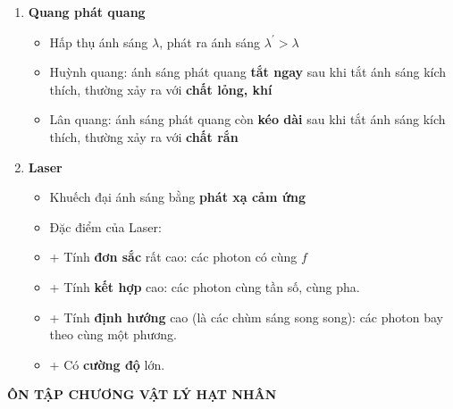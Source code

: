\documentclass[a4paper,12pt,titlepage,twocolumn]{article}
\newenvironment{myitemize} 
{ \begin{itemize}[leftmargin=*,label=-]  %
		\setlength{\itemsep}{0pt}
		\setlength{\parskip}{0pt}
		\setlength{\parsep}{0pt}     }
{ \end{itemize}                  }
\newenvironment{myenumerate}
{ \begin{enumerate}[label=\textbf{\arabic*}.]
\setlist{nolistsep} %
\setlength{\itemsep}{0pt}
\setlength{\parskip}{0pt}
\setlength{\parsep}{0pt}	}
{ \end{enumerate}}
\begin{document}
\begin{myenumerate}
	\item \textbf{Quang phát quang}
	\begin{myitemize}
		\item Hấp thụ ánh sáng $\lambda$, phát ra ánh sáng $\lambda^\prime > \lambda$
		\item Huỳnh quang: ánh sáng phát quang \textbf{tắt ngay} sau khi tắt ánh sáng kích thích, thường xảy ra với \textbf{chất lỏng, khí}
		\item Lân quang: ánh sáng phát quang còn \textbf{kéo dài} sau khi tắt ánh sáng kích thích, thường xảy ra với \textbf{chất rắn} \\
	\end{myitemize} 
	\item \textbf{Laser}
	\begin{myitemize}
		\item Khuếch đại ánh sáng bằng \textbf{phát xạ cảm ứng}
		\item Đặc điểm của Laser:
		\setlength{\itemindent}{0.5cm} %
		\item[+] Tính \textbf{đơn sắc} rất cao: các photon có cùng $f$
		\item[+] Tính \textbf{kết hợp} cao: các photon cùng tần số, cùng pha.
		\item[+] Tính \textbf{định hướng} cao (là các chùm sáng song song): các photon bay theo cùng một phương.
		\item[+] Có \textbf{cường độ} lớn.
	\end{myitemize}
\end{myenumerate}	
\begin{adjustwidth}{-0.2cm}{}
	\begin{center}
		\small\textbf{ÔN TẬP CHƯƠNG VẬT LÝ HẠT NHÂN}
	\end{center}
\end{adjustwidth}
\end{document}
